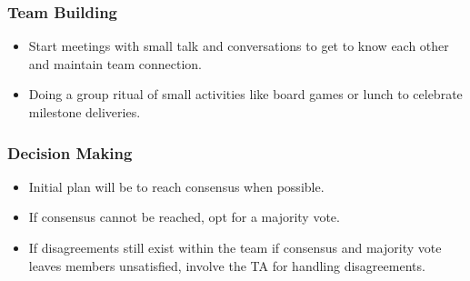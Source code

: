 \documentclass{article}
\begin{document}
\subsubsection*{Team Building}
\begin{itemize}
    \item Start meetings with small talk and conversations to get to know each other and maintain team connection.
    \item Doing a group ritual of small activities like board games or lunch to celebrate milestone deliveries.
\end{itemize}

\subsubsection*{Decision Making} 
\begin{itemize}
    \item Initial plan will be to reach consensus when possible.
    \item If consensus cannot be reached, opt for a majority vote.
    \item If disagreements still exist within the team if consensus and majority vote leaves members unsatisfied, involve the TA for handling disagreements.
\end{itemize}
\end{document}

